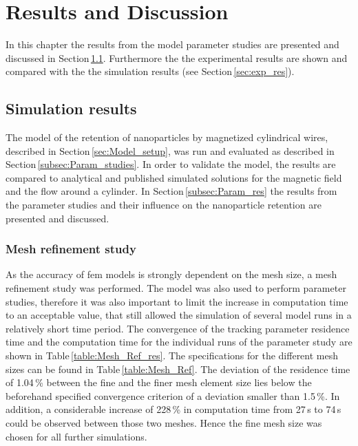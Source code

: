 

\chapter{Results and Discussion}
\label{chap:chap_res}
In this chapter the results from the model parameter studies are presented and discussed in Section\,\ref{sec:sim_res}. Furthermore the the experimental results are shown and compared with the the simulation results (see Section\,\ref{sec:exp_res}). 

\section{Simulation results}
\label{sec:sim_res}
The model of the retention of nanoparticles by magnetized cylindrical wires, described in Section\,\ref{sec:Model_setup}, was run and evaluated as described in Section\,\ref{subsec:Param_studies}. In order to validate the model, the results are compared to analytical and published simulated solutions for the magnetic field and the flow around a cylinder. In Section\,\ref{subsec:Param_res} the results from the parameter studies and their influence on the nanoparticle retention are presented and discussed.  

\subsection{Mesh refinement study}
\label{subsec:mesh_ref}
As the accuracy of \gls{fem} models is strongly dependent on the mesh size, a mesh refinement study was performed. The model was also used to perform parameter studies, therefore it was also important to limit the increase in computation time to an acceptable value, that still allowed the simulation of several model runs in a  relatively short time period. The convergence of the tracking parameter residence time and the computation time for the individual runs of the parameter study are shown in Table\,\ref{table:Mesh_Ref_res}. The specifications for the different mesh sizes can be found in Table\,\ref{table:Mesh_Ref}. The deviation of the residence time of 1.04\,\% between the fine and the finer mesh element size lies below the beforehand specified convergence criterion of a deviation smaller than 1.5\,\%. In addition, a considerable increase of 228\,\% in computation time from 27\,s to 74\,s could be observed between those two meshes. Hence the fine mesh size was chosen for all further simulations. 

